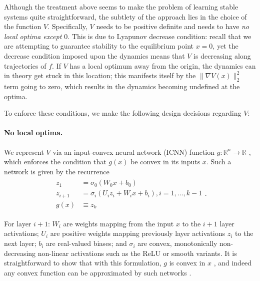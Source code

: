 Although the treatment above seems to make the problem of learning stable systems quite straightforward, the subtlety of the approach lies in the choice of the function $V$. Specifically, $V$ needs to be positive definite and needs to have \emph{no local optima except $0$}. This is due to Lyapunov decrease condition: recall that we are attempting to guarantee stability to the equilibrium point $x=0$, yet the decrease condition imposed upon the dynamics means that $V$ is decreasing along trajectories of $f$.  If $V$ has a local optimum away from the origin, the dynamics can in theory get stuck in this location; this manifests itself by the $\|\nabla V(x)\|_2^2$ term going to zero, which results in the dynamics becoming undefined at the optima.

To enforce these conditions, we make the following design decisions regarding $V$:

\paragraph{No local optima.} We represent $V$ via an input-convex neural network (ICNN) function $g : \mathbb R^n \to \mathbb R$ \citep{amos2017input}, which enforces the condition that $g(x)$ be convex in its inputs $x$. Such a network is given by the recurrence
\begin{align}
	\begin{split}
		z_1 & = \sigma_0(W_0 x + b_0) \\
		z_{i+1} & = \sigma_i(U_i z_i + W_i x + b_i), i=1,\ldots,k-1 \\
		g(x) & \equiv z_k
	\end{split} . \label{eqn:icnnrecurrence}
\end{align}

For layer $i+1$: $W_i$ are weights mapping from the input $x$ to the $i+1$ layer activations; $U_i$ are positive weights mapping previously layer activations $z_i$ to the next layer; $b_i$ are real-valued biases; and $\sigma_i$ are convex, monotonically non-decreasing non-linear activations such as the ReLU or smooth variants. It is straightforward to show that with this formulation, $g$ is convex in $x$ \citep{amos2017input}, and indeed any convex function can be approximated by such networks \citep{chen2018optimal}.

